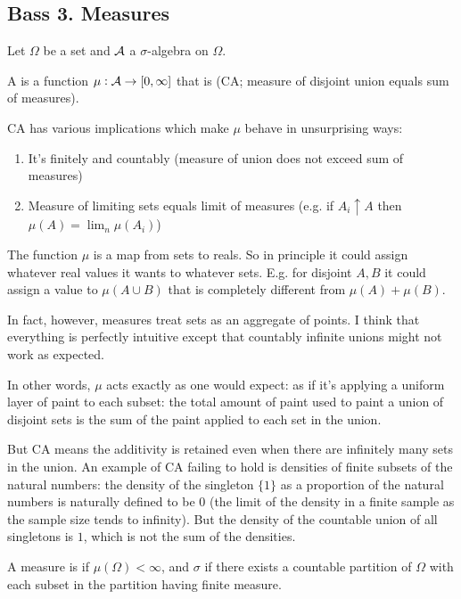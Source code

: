 \subsection{Bass 3. Measures}

Let $\Omega$ be a set and $\mathcal A$ a $\sigma$-algebra on $\Omega$.

A  is a function $\mu:\mathcal A \to [0, \infty]$ that is  (CA; measure of disjoint union equals sum of measures).

CA has various implications which make $\mu$ behave in unsurprising ways:
\begin{enumerate}
\item It's finitely and countably  (measure of union does not exceed sum of measures)
\item Measure of limiting sets equals limit of measures (e.g. if $A_i \uparrow A$ then $\mu(A) = \lim_n \mu(A_i)$)
\end{enumerate}

\begin{intuition*}
  The function $\mu$ is a map from sets to reals. So in principle it could assign whatever real values it wants
  to whatever sets. E.g. for disjoint $A, B$ it could assign a value to $\mu(A \cup B)$ that is completely
  different from $\mu(A) + \mu(B)$.

  In fact, however, measures treat sets as an aggregate of points. I think that everything is perfectly
  intuitive except that countably infinite unions might not work as expected.

  In other words, $\mu$ acts exactly as one would expect: as if it's applying a uniform layer of paint to each
  subset: the total amount of paint used to paint a union of disjoint sets is the sum of the paint applied to
  each set in the union.

  But CA means the additivity is retained even when there are infinitely many sets in the union. An example of CA
  failing to hold is densities of finite subsets of the natural numbers: the density of the singleton $\{1\}$ as
  a proportion of the natural numbers is naturally defined to be $0$ (the limit of the density in a finite sample
  as the sample size tends to infinity). But the density of the countable union of all singletons is $1$, which is
  not the sum of the densities.
\end{intuition*}

A measure is  if $\mu(\Omega) < \infty$, and $\sigma$ if there exists a countable partition
of $\Omega$ with each subset in the partition having finite measure.


